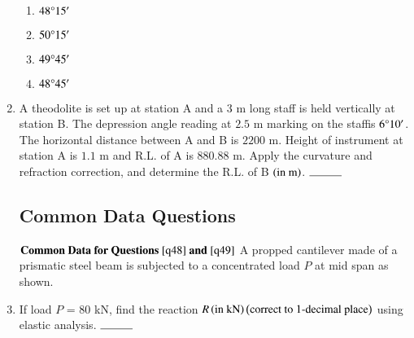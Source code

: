 \documentclass[journal,onecolumn]{IEEEtran}
\theoremstyle{remark}
\begin{document}
\begin{enumerate}
	\begin{enumerate}
		\item $48\degree 15^{\prime}$
		\item $50\degree 15^{\prime}$
		\item $49\degree 45^{\prime}$
		\item $48\degree 45^{\prime}$
	\end{enumerate}

    \item A theodolite is set up at station A and a $3$ m long staff is held vertically at station B. The depression
angle reading at $2.5$ m marking on the staffis $6\degree 10^{\prime}$. The horizontal distance between A and B is
$2200$ m. Height of instrument at station A is $1.1$ m and R.L. of A is $880.88$ m. Apply the curvature
and refraction correction, and determine the R.L. of B $\left(\text{in m}\right)$. $\rule{1cm}{0.15mm}$ 
	\hfill{}

	\subsection{Common Data Questions}
	$\textbf{Common Data for Questions } \ref{q48} \textbf{ and } \ref{q49}$
	\newline
    A propped cantilever made of a prismatic steel beam is subjected to a concentrated load $P$ at mid span as shown.
	\begin{center}
	\end{center}

	\item \label{q48} If load $P$ = $80$ kN, find the reaction $R \left(\text{in kN}\right) \left(\text{correct to } 1 \text{-decimal place}\right)$ using elastic analysis. $\rule{1cm}{0.15mm}$ 
	\hfill{}


\end{enumerate}
\end{document}
